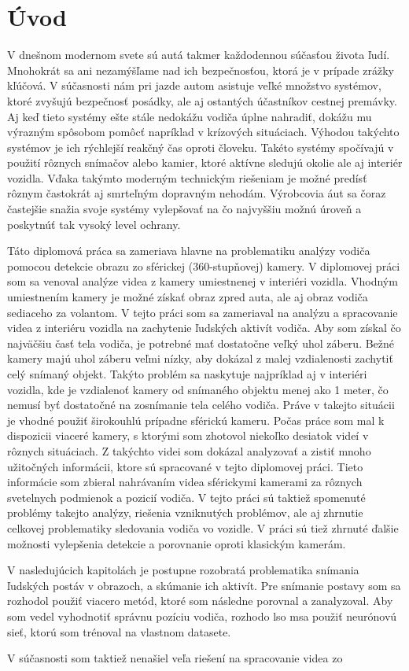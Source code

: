 \documentclass[slovak,master,dept460,male,cpp,cpdeclaration]{diploma}
\begin{document}
\MakeTitlePages

\section{Úvod}
\label{sec:Introduction}
V dnešnom modernom svete sú autá takmer každodennou súčasťou života ľudí. Mnohokrát sa ani nezamýšľame nad ich bezpečnosťou, ktorá je v prípade zrážky kľúčová. V súčasnosti nám pri jazde autom asistuje veľké množstvo systémov, ktoré zvyšujú bezpečnosť posádky, ale aj ostantých účastníkov cestnej premávky. Aj keď tieto systémy ešte stále nedokážu vodiča úplne nahradiť, dokážu mu výrazným spôsobom pomôcť napríklad v krízových situáciach. Výhodou takýchto systémov je ich rýchlejší reakčný čas oproti človeku. Takéto systémy spočívajú v použití rôznych snímačov alebo kamier, ktoré aktívne sledujú okolie ale aj interiér vozidla. Vďaka takýmto moderným technickým riešeniam je možné predísť rôznym  častokrát aj smrteľným dopravným nehodám. Výrobcovia áut sa čoraz častejšie snažia svoje systémy vylepšovať na čo najvyššiu možnú úroveň a poskytnúť tak vysoký level ochrany.\par Táto diplomová práca sa zameriava hlavne na problematiku analýzy vodiča pomocou detekcie obrazu zo sférickej (360-stupňovej) kamery. V diplomovej práci som sa venoval analýze videa z kamery umiestnenej v interiéri vozidla. Vhodným umiestnením kamery je možné získať obraz zpred auta, ale aj obraz vodiča sediaceho za volantom. V tejto práci som sa zameriaval na analýzu a spracovanie videa z interiéru vozidla na zachytenie ľudských aktivít vodiča. Aby som získal čo najväčšiu časť tela vodiča, je potrebné mať dostatočne veľký uhol záberu. Bežné kamery majú uhol záberu veľmi nízky, aby dokázal z malej vzdialenosti zachytiť celý snímaný objekt. Takýto problém sa naskytuje najpríklad aj v interiéri vozidla, kde je vzdialenoť kamery od snímaného objektu menej ako 1 meter, čo nemusí byť dostatočné na zosnímanie tela celého vodiča. Práve v takejto situácii je vhodné použiť širokouhlú prípadne sférickú kameru. Počas práce som mal k dispozicii viaceré kamery, s ktorými som zhotovol niekoľko desiatok videí v rôznych situáciach. Z takýchto videi som dokázal analyzovať a zistiť mnoho užitočných informácii, ktore sú spracované v tejto diplomovej práci. Tieto informácie som zbieral nahrávaním videa sférickymi kamerami za rôznych svetelnych  podmienok a pozicií vodiča. V tejto práci sú taktiež spomenuté problémy takejto analýzy, riešenia vzniknutých problémov, ale aj zhrnutie celkovej problematiky sledovania vodiča vo vozidle. V práci sú tiež zhrnuté ďalšie možnosti vylepšenia detekcie a porovnanie oproti klasickým kamerám.\par V nasledujúcich kapitolách je postupne rozobratá problematika snímania ľudských postáv v obrazoch, a skúmanie ich aktivít. Pre snímanie postavy som sa rozhodol použiť viacero metód, ktoré som následne porovnal a zanalyzoval. Aby som vedel vyhodnotiť správnu pozíciu vodiča, rozhodo lso msa  použiť neurónovú sieť, ktorú som trénoval na vlastnom datasete.\par V súčasnosti som taktiež nenašiel veľa riešení na spracovanie videa zo 
\end{document}
